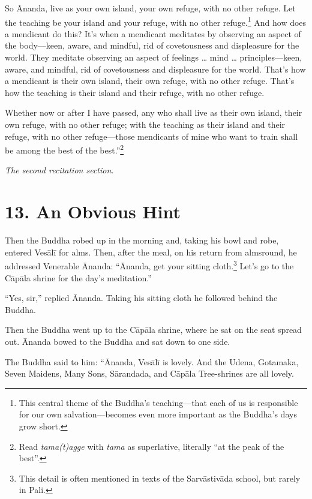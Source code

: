 \documentclass[12pt,openany]{book}%
\newcommand*{\scendsection}[1]{\begin{Center}\begin{small}\textit{#1}\end{small}\end{Center}\addvspace{1em}}
\begin{document}
So Ānanda, live as your own island, your own refuge, with no other refuge. Let the teaching be your island and your refuge, with no other refuge.\footnote{This central theme of the Buddha’s teaching—that each of us is responsible for our own salvation—becomes even more important as the Buddha’s days grow short. } And how does a mendicant do this? It’s when a mendicant meditates by observing an aspect of the body—keen, aware, and mindful, rid of covetousness and displeasure for the world. They meditate observing an aspect of feelings … mind … principles—keen, aware, and mindful, rid of covetousness and displeasure for the world. That’s how a mendicant is their own island, their own refuge, with no other refuge. That’s how the teaching is their island and their refuge, with no other refuge. 

Whether now or after I have passed, any who shall live as their own island, their own refuge, with no other refuge; with the teaching as their island and their refuge, with no other refuge—those mendicants of mine who want to train shall be among the best of the best.”\footnote{Read \textit{tama(t)agge} with \textit{tama} as superlative, literally “at the peak of the best”. } 

\scendsection{The second recitation section. }

\section*{13. An Obvious Hint }

Then the Buddha robed up in the morning and, taking his bowl and robe, entered \textsanskrit{Vesālī} for alms. Then, after the meal, on his return from almsround, he addressed Venerable Ānanda: “Ānanda, get your sitting cloth.\footnote{This detail is often mentioned in texts of the \textsanskrit{Sarvāstivāda} school, but rarely in Pali. } Let’s go to the \textsanskrit{Cāpāla} shrine for the day’s meditation.” 

“Yes, sir,” replied Ānanda. Taking his sitting cloth he followed behind the Buddha. 

Then the Buddha went up to the \textsanskrit{Cāpāla} shrine, where he sat on the seat spread out. Ānanda bowed to the Buddha and sat down to one side. 

The Buddha said to him: “Ānanda, \textsanskrit{Vesālī} is lovely. And the Udena, Gotamaka, Seven Maidens, Many Sons, \textsanskrit{Sārandada}, and \textsanskrit{Cāpāla} Tree-shrines are all lovely. 
\end{document}
